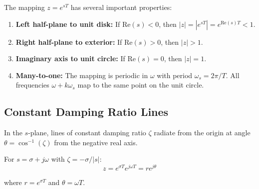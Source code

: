 The mapping $z = e^{sT}$ has several important properties:

\begin{enumerate}
    \item \textbf{Left half-plane to unit disk:} If $\text{Re}(s) < 0$, then $|z| = |e^{sT}| = e^{\text{Re}(s)T} < 1$.

    \item \textbf{Right half-plane to exterior:} If $\text{Re}(s) > 0$, then $|z| > 1$.

    \item \textbf{Imaginary axis to unit circle:} If $\text{Re}(s) = 0$, then $|z| = 1$.

    \item \textbf{Many-to-one:} The mapping is periodic in $\omega$ with period $\omega_s = 2\pi/T$. All frequencies $\omega + k\omega_s$ map to the same point on the unit circle.
\end{enumerate}

\subsection{Constant Damping Ratio Lines}

In the $s$-plane, lines of constant damping ratio $\zeta$ radiate from the origin at angle $\theta = \cos^{-1}(\zeta)$ from the negative real axis.

For $s = \sigma + j\omega$ with $\zeta = -\sigma/|s|$:
\begin{equation}
z = e^{\sigma T} e^{j\omega T} = r e^{j\theta}
\end{equation}

where $r = e^{\sigma T}$ and $\theta = \omega T$.

